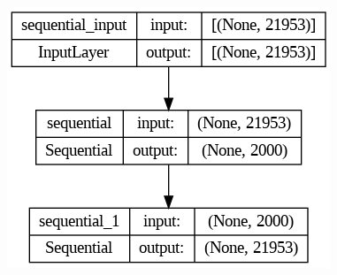     {
        \centering
        \includegraphics[width=.65\columnwidth]{./images/model.png}
        \label{fig:architecture}
    }

